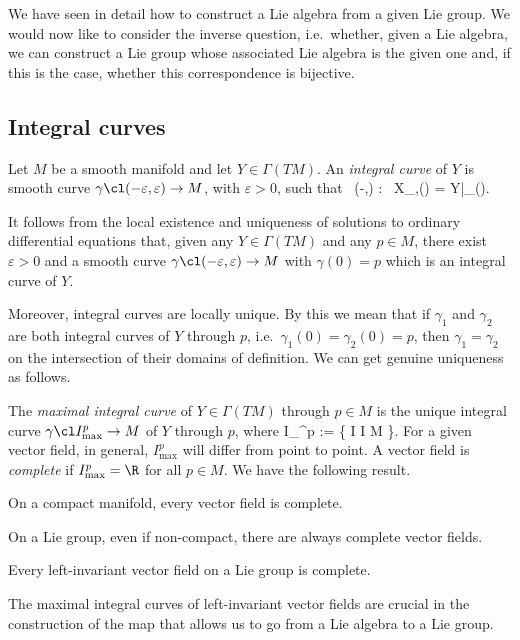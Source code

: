 

We have seen in detail how to construct a Lie algebra from a given Lie group. We would now like to consider the inverse question, i.e.\ whether, given a Lie algebra, we can construct a Lie group whose associated Lie algebra is the given one and, if this is the case, whether this correspondence is bijective.


\subsection{Integral curves}

\bd
Let $M$ be a smooth manifold and let $Y\in \Gamma(TM)$. An \emph{integral curve} of $Y$ is smooth curve $\gamma\cl(-\varepsilon,\varepsilon)\to M$, with $\varepsilon > 0$, such that
\bse
\forall \, \lambda \in (-\varepsilon,\varepsilon) : \ X_{\gamma,\gamma(\lambda)} = Y|_{\gamma(\lambda)}.
\ese
\ed

It follows from the local existence and uniqueness of solutions to ordinary differential equations that, given any $Y\in \Gamma(TM)$ and any $p\in M$, there exist $\varepsilon >0$ and a smooth curve $\gamma\cl (-\varepsilon,\varepsilon) \to M$ with $\gamma(0)=p$ which is an integral curve of $Y$. 

Moreover, integral curves are locally unique. By this we mean that if $\gamma_1$ and $\gamma_2$ are both integral curves of $Y$ through $p$, i.e.\ $\gamma_1(0)=\gamma_2(0) = p$, then $\gamma_1=\gamma_2$ on the intersection of their domains of definition. We can get genuine uniqueness as follows.

\bd
The \emph{maximal integral curve} of $Y\in \Gamma(TM)$ through $p\in M$ is the unique integral curve $\gamma\cl I^p_{\mathrm{max}}\to M$ of $Y$ through $p$, where
\bse
I_{}^{p} := \bigcup\{ I \se \R \mid {}\gamma\cl I \to M \}.
\ese
\ed
For a given vector field, in general, $I_{\mathrm{max}}^{p}$ will differ from point to point. 
\bd
A vector field is \emph{complete} if $I_{\mathrm{max}}^{p}=\R$ for all $p\in M$.
\ed
We have the following result.
\begin{theorem}
On a compact manifold, every vector field is complete.
\end{theorem}
On a Lie group, even if non-compact, there are always complete vector fields.
\begin{theorem}
Every left-invariant vector field on a Lie group is complete.
\end{theorem}
The maximal integral curves of left-invariant vector fields are crucial in the construction of the map that allows us to go from a Lie algebra to a Lie group.

